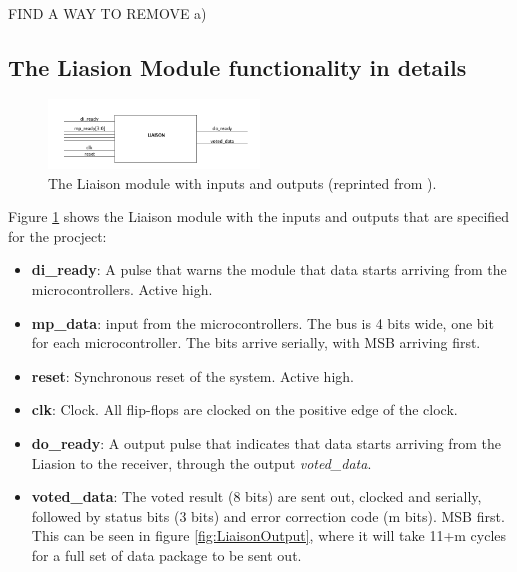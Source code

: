\documentclass[a4paper]{IEEEtran}
\begin{document}
\paragraph{}
FIND A WAY TO REMOVE a)


\subsection{The Liasion Module functionality in details}

\begin{figure}[h!]
    \centering
    \includegraphics[width=0.5\textwidth]{Figures/ProjectDescription/LiaisonBlackBox}
    \caption{The Liaison module with inputs and outputs (reprinted from \protect\cite{assignment-text}).}
    \label{fig:LiaisonBlackBox}
\end{figure}

Figure \ref{fig:LiaisonBlackBox} shows the Liaison module with the inputs and outputs that are specified for the procject:
\begin{itemize}
    \item \textbf{di\_ready}: A pulse that warns the module that data starts arriving from the microcontrollers. Active high.
    \item \textbf{mp\_data}: input from the microcontrollers. The bus is 4 bits wide, one bit for each microcontroller. The bits arrive serially, with MSB arriving first.
    \item \textbf{reset}: Synchronous reset of the system. Active high.
    \item \textbf{clk}: Clock. All flip-flops are clocked on the positive edge of the clock.
    \item \textbf{do\_ready}: A output pulse that indicates that data starts arriving from the Liasion to the receiver, through the output \textit{voted\_data}.
    \item  \textbf{voted\_data}: The voted result (8 bits) are sent out, clocked and serially, followed by status bits (3 bits) and error correction code (m bits).
        MSB first.
        This can be seen in figure \ref{fig:LiaisonOutput}, where it will take 11+m cycles for a full set of data package to be sent out.
\end{itemize}
\end{document}
